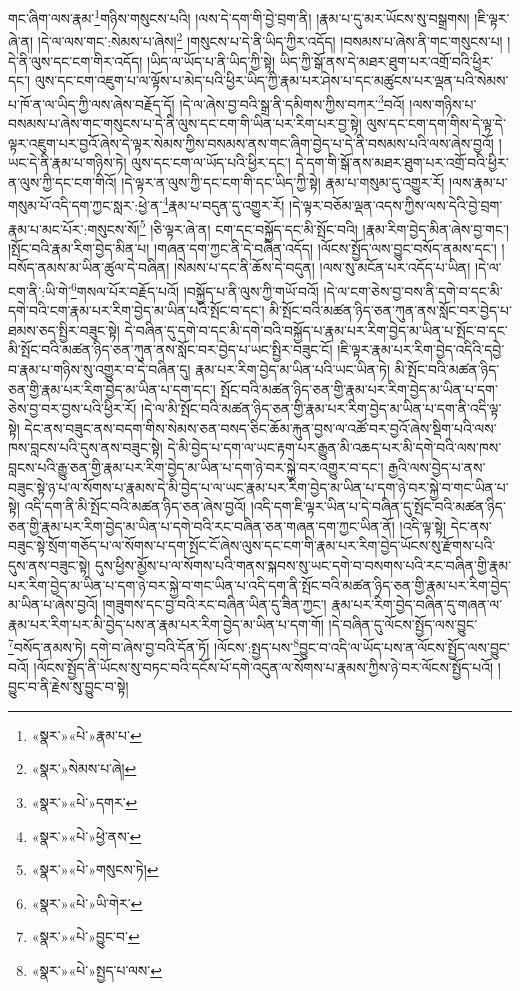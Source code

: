གང་ཞིག་ལས་རྣམ་\footnote{«སྣར་»«པེ་»རྣམ་པ་}གཉིས་གསུངས་པའི། །ལས་དེ་དག་གི་བྱེ་བྲག་ནི། །རྣམ་པ་དུ་མར་ཡོངས་སུ་བསྒྲགས། །ཇི་ལྟར་ཞེ་ན། །དེ་ལ་ལས་གང་:སེམས་པ་ཞེས།\footnote{«སྣར་»སེམས་པ་ཞེ།} །གསུངས་པ་དེ་ནི་ཡིད་ཀྱིར་འདོད། །བསམས་པ་ཞེས་ནི་གང་གསུངས་པ། །དེ་ནི་ལུས་དང་ངག་གིར་འདོད། །ཡིད་ལ་ཡོད་པ་ནི་ཡིད་ཀྱི་སྟེ། ཡིད་ཀྱི་སྒོ་ནས་དེ་མཐར་ཐུག་པར་འགྲོ་བའི་ཕྱིར་དང་། ལུས་དང་ངག་འཇུག་པ་ལ་ལྟོས་པ་མེད་པའི་ཕྱིར་ཡིད་ཀྱི་རྣམ་པར་ཤེས་པ་དང་མཚུངས་པར་ལྡན་པའི་སེམས་པ་ཁོ་ན་ལ་ཡིད་ཀྱི་ལས་ཞེས་བརྗོད་དོ། །དེ་ལ་ཞེས་བྱ་བའི་སྒྲ་ནི་དམིགས་ཀྱིས་བཀར་\footnote{«སྣར་»«པེ་»དགར་}བའོ། །ལས་གཉིས་པ་བསམས་པ་ཞེས་གང་གསུངས་པ་དེ་ནི་ལུས་དང་ངག་གི་ཡིན་པར་རིག་པར་བྱ་སྟེ། ལུས་དང་ངག་དག་གིས་དེ་ལྟ་དེ་ལྟར་འཇུག་པར་བྱའོ་ཞེས་དེ་ལྟར་སེམས་ཀྱིས་བསམས་ནས་གང་ཞིག་བྱེད་པ་དེ་ནི་བསམས་པའི་ལས་ཞེས་བྱའོ། །ཡང་དེ་ནི་རྣམ་པ་གཉིས་ཏེ། ལུས་དང་ངག་ལ་ཡོད་པའི་ཕྱིར་དང་། དེ་དག་གི་སྒོ་ནས་མཐར་ཐུག་པར་འགྲོ་བའི་ཕྱིར་ན་ལུས་ཀྱི་དང་ངག་གིའོ། །དེ་ལྟར་ན་ལུས་ཀྱི་དང་ངག་གི་དང་ཡིད་ཀྱི་སྟེ། རྣམ་པ་གསུམ་དུ་འགྱུར་རོ། །ལས་རྣམ་པ་གསུམ་པོ་འདི་དག་ཀྱང་སླར་:ཕྱེ་ན་\footnote{«སྣར་»«པེ་»ཕྱེ་ནས་}རྣམ་པ་བདུན་དུ་འགྱུར་རོ། །དེ་ལྟར་བཅོམ་ལྡན་འདས་ཀྱིས་ལས་དེའི་བྱེ་བྲག་རྣམ་པ་མང་པོར་:གསུངས་སོ།\footnote{«སྣར་»«པེ་»གསུངས་ཏེ།} །ཅི་ལྟར་ཞེ་ན། ངག་དང་བསྐྱོད་དང་མི་སྤོང་བའི། །རྣམ་རིག་བྱེད་མིན་ཞེས་བྱ་གང་། །སྤོང་བའི་རྣམ་རིག་བྱེད་མིན་པ། །གཞན་དག་ཀྱང་ནི་དེ་བཞིན་འདོད། །ལོངས་སྤྱོད་ལས་བྱུང་བསོད་ནམས་དང་། །བསོད་ནམས་མ་ཡིན་ཚུལ་དེ་བཞིན། །སེམས་པ་དང་ནི་ཆོས་དེ་བདུན། །ལས་སུ་མངོན་པར་འདོད་པ་ཡིན། །དེ་ལ་ངག་ནི་:ཡི་གེ་\footnote{«སྣར་»«པེ་»ཡི་གེར་}གསལ་པོར་བརྗོད་པའོ། །བསྐྱོད་པ་ནི་ལུས་ཀྱི་གཡོ་བའོ། །དེ་ལ་ངག་ཅེས་བྱ་བས་ནི་དགེ་བ་དང་མི་དགེ་བའི་ངག་རྣམ་པར་རིག་བྱེད་མ་ཡིན་པའི་སྤོང་བ་དང་། མི་སྤོང་བའི་མཚན་ཉིད་ཅན་ཀུན་ནས་སློང་བར་བྱེད་པ་ཐམས་ཅད་སྤྱིར་བཟུང་སྟེ། དེ་བཞིན་དུ་དགེ་བ་དང་མི་དགེ་བའི་བསྐྱོད་པ་རྣམ་པར་རིག་བྱེད་མ་ཡིན་པ་སྤོང་བ་དང་མི་སྤོང་བའི་མཚན་ཉིད་ཅན་ཀུན་ནས་སློང་བར་བྱེད་པ་ཡང་སྤྱིར་བཟུང་ངོ། །ཇི་ལྟར་རྣམ་པར་རིག་བྱེད་འདིའི་དབྱེ་བ་རྣམ་པ་གཉིས་སུ་འགྱུར་བ་དེ་བཞིན་དུ། རྣམ་པར་རིག་བྱེད་མ་ཡིན་པའི་ཡང་ཡིན་ཏེ། མི་སྤོང་བའི་མཚན་ཉིད་ཅན་གྱི་རྣམ་པར་རིག་བྱེད་མ་ཡིན་པ་དག་དང་། སྤོང་བའི་མཚན་ཉིད་ཅན་གྱི་རྣམ་པར་རིག་བྱེད་མ་ཡིན་པ་དག་ཅེས་བྱ་བར་བྱས་པའི་ཕྱིར་རོ། །དེ་ལ་མི་སྤོང་བའི་མཚན་ཉིད་ཅན་གྱི་རྣམ་པར་རིག་བྱེད་མ་ཡིན་པ་དག་ནི་འདི་ལྟ་སྟེ། དེང་ནས་བཟུང་ནས་བདག་གིས་སེམས་ཅན་བསད་ཅིང་ཆོམ་རྐུན་བྱས་ལ་འཚོ་བར་བྱའོ་ཞེས་སྡིག་པའི་ལས་ཁས་བླངས་པའི་དུས་ནས་བཟུང་སྟེ། དེ་མི་བྱེད་པ་དག་ལ་ཡང་རྟག་པར་རྒྱུན་མི་འཆད་པར་མི་དགེ་བའི་ལས་ཁས་བླངས་པའི་རྒྱུ་ཅན་གྱི་རྣམ་པར་རིག་བྱེད་མ་ཡིན་པ་དག་ཉེ་བར་སྐྱེ་བར་འགྱུར་བ་དང་། རྒྱའི་ལས་བྱེད་པ་ནས་བཟུང་སྟེ་ཉ་པ་ལ་སོགས་པ་རྣམས་དེ་མི་བྱེད་པ་ལ་ཡང་རྣམ་པར་རིག་བྱེད་མ་ཡིན་པ་དག་ཉེ་བར་སྐྱེ་བ་གང་ཡིན་པ་སྟེ། འདི་དག་ནི་མི་སྤོང་བའི་མཚན་ཉིད་ཅན་ཞེས་བྱའོ། །འདི་དག་ཇི་ལྟར་ཡིན་པ་དེ་བཞིན་དུ་སྤོང་བའི་མཚན་ཉིད་ཅན་གྱི་རྣམ་པར་རིག་བྱེད་མ་ཡིན་པ་དགེ་བའི་རང་བཞིན་ཅན་གཞན་དག་ཀྱང་ཡིན་ནོ། །འདི་ལྟ་སྟེ། དེང་ནས་བཟུང་སྟེ་སྲོག་གཅོད་པ་ལ་སོགས་པ་དག་སྤོང་ངོ་ཞེས་ལུས་དང་ངག་གི་རྣམ་པར་རིག་བྱེད་ཡོངས་སུ་རྫོགས་པའི་དུས་ནས་བཟུང་སྟེ། དུས་ཕྱིས་མྱོས་པ་ལ་སོགས་པའི་གནས་སྐབས་སུ་ཡང་དགེ་བ་བསགས་པའི་རང་བཞིན་གྱི་རྣམ་པར་རིག་བྱེད་མ་ཡིན་པ་དག་ཉེ་བར་སྐྱེ་བ་གང་ཡིན་པ་འདི་དག་ནི་སྤོང་བའི་མཚན་ཉིད་ཅན་གྱི་རྣམ་པར་རིག་བྱེད་མ་ཡིན་པ་ཞེས་བྱའོ། །གཟུགས་དང་བྱ་བའི་རང་བཞིན་ཡིན་དུ་ཟིན་ཀྱང་། རྣམ་པར་རིག་བྱེད་བཞིན་དུ་གཞན་ལ་རྣམ་པར་རིག་པར་མི་བྱེད་པས་ན་རྣམ་པར་རིག་བྱེད་མ་ཡིན་པ་དག་གོ། །དེ་བཞིན་དུ་ལོངས་སྤྱོད་ལས་བྱུང་\footnote{«སྣར་»«པེ་»བྱུང་བ་}བསོད་ནམས་ཏེ། དགེ་བ་ཞེས་བྱ་བའི་དོན་ཏོ། །ལོངས་:སྤྱད་པས་\footnote{«སྣར་»«པེ་»སྤྱད་པ་ལས་}བྱུང་བ་འདི་ལ་ཡོད་པས་ན་ལོངས་སྤྱོད་ལས་བྱུང་བའོ། །ལོངས་སྤྱོད་ནི་ཡོངས་སུ་བཏང་བའི་དངོས་པོ་དགེ་འདུན་ལ་སོགས་པ་རྣམས་ཀྱིས་ཉེ་བར་ལོངས་སྤྱོད་པའོ། །བྱུང་བ་ནི་རྗེས་སུ་བྱུང་བ་སྟེ། 